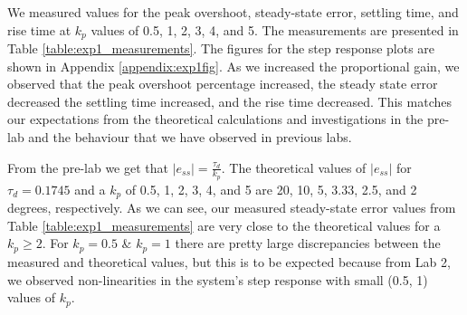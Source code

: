 \documentclass[12pt]{article}
\begin{document}
We measured values for the peak overshoot, steady-state error, settling time, and rise time at $k_p$ values of 0.5, 1, 2, 3, 4, and 5. The measurements are presented in Table \ref{table:exp1_measurements}. The figures for the step response plots are shown in Appendix \ref{appendix:exp1fig}. As we increased the proportional gain, we observed that the peak overshoot percentage increased, the steady state error decreased the settling time increased, and the rise time decreased. This matches our expectations from the theoretical calculations and investigations in the pre-lab and the behaviour that we have observed in previous labs. %


From the pre-lab we get that $\left|e_{ss}\right| = \frac{\tau_d}{k_p}$. The theoretical values of $\left|e_{ss}\right|$ for $\tau_d = 0.1745$ and a $k_p$ of 0.5, 1, 2, 3, 4, and 5 are 20, 10, 5, 3.33, 2.5, and 2 degrees, respectively. As we can see, our measured steady-state error values from Table \ref{table:exp1_measurements} are very close to the theoretical values for a $k_p \geq 2$. For $k_p = 0.5$ & $k_p = 1$ there are pretty large discrepancies between the measured and theoretical values, but this is to be expected because from Lab 2, we observed non-linearities in the system's step response with small (0.5, 1) values of $k_p$.
\end{document}
